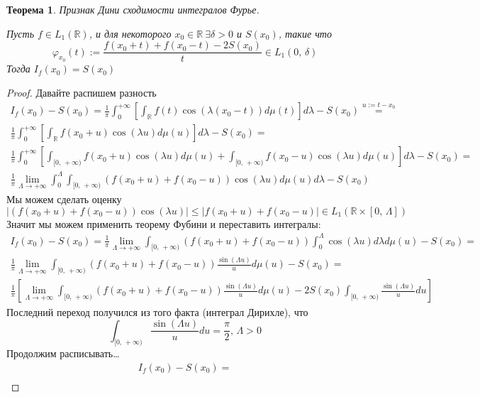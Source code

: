 \documentclass[a4paper,12pt]{article}
\renewcommand{\phi}{\ensuremath{\varphi}}
\renewcommand{\leq}{\ensuremath{\leqslant}}
\theoremstyle{plain}
\newtheorem{theorem}{Теорема}[section]
\theoremstyle{definition}
\theoremstyle{remark}
\begin{document}
\begin{theorem}
	Признак Дини сходимости интегралов Фурье.

	Пусть $f \in L_1(\mathbb{R})$, и для некоторого $x_0 \in \mathbb{R}\: \exists \delta > 0$ и $S(x_0)$, такие что
	\[\phi_{x_0}(t) := \frac{f(x_0 + t) + f(x_0 - t) - 2S(x_0)}{t} \in L_1(0,\,\delta)\]
	Тогда $I_f(x_0) = S(x_0)$
\end{theorem}
\begin{proof} \label{DINI_FURRY}
	Давайте распишем разность
	\begin{align*}
		I_f(x_0) - S(x_0) = \frac{1}{\pi}\int_0^{+\infty}\left[\int_\mathbb{R}f(t)\cos(\lambda (x_0 - t))d\mu(t)\right]d\lambda - S(x_0) \stackrel{u := t - x_0}{=}              \\
		\frac{1}{\pi}\int_0^{+\infty}\left[\int_\mathbb{R}f(x_0 + u)\cos(\lambda u)d\mu(u)\right]d\lambda - S(x_0) =                                                             \\
		\frac{1}{\pi}\int_0^{+\infty}\left[\int_{[0,\,+\infty)}f(x_0 + u)\cos(\lambda u)d\mu(u) + \int_{[0,\,+\infty)}f(x_0 - u)\cos(\lambda u)d\mu(u)\right]d\lambda - S(x_0) = \\
		\frac{1}{\pi}\lim_{\Lambda \to +\infty}\int_0^\Lambda\int_{[0,\,+\infty)}(f(x_0 + u) + f(x_0 - u))\cos(\lambda u)d\mu(u)d\lambda - S(x_0)
	\end{align*}
	Мы можем сделать оценку
	\[|(f(x_0 + u) + f(x_0 - u))\cos(\lambda u)| \leq |f(x_0 + u) + f(x_0 - u)| \in L_1(\mathbb{R} \times [0,\, \Lambda])\]
	Значит мы можем применить теорему Фубини и переставить интегралы:
	\begin{align*}
		I_f(x_0) - S(x_0) = \frac{1}{\pi}\lim_{\Lambda \to +\infty} \int_{[0,\,+\infty)} (f(x_0 + u) + f(x_0 - u)) \int_0^\Lambda \cos(\lambda u)d\lambda d\mu(u) - S(x_0) = \\
		\frac{1}{\pi}\lim_{\Lambda \to +\infty} \int_{[0,\,+\infty)} (f(x_0 + u) + f(x_0 - u)) \frac{\sin(\Lambda u)}{u}d\mu(u) - S(x_0) =                                   \\
		\frac{1}{\pi}\left[\lim_{\Lambda \to +\infty} \int_{[0,\,+\infty)} (f(x_0 + u) + f(x_0 - u))\frac{\sin(\Lambda u)}{u}d\mu(u) - 2S(x_0)\int_{[0,\,+\infty)} \frac{\sin(\Lambda u)}{u}du\right]
	\end{align*}
	Последний переход получился из того факта (интеграл Дирихле), что
	\[\int_{[0,\,+\infty)}\frac{\sin(\Lambda u)}{u}du = \frac{\pi}{2},\, \Lambda > 0\]
	Продолжим расписывать\dots
	\begin{align*}
		I_f(x_0) - S(x_0) =                                                                                             \\

\end{align*}
\end{proof}
\end{document}
